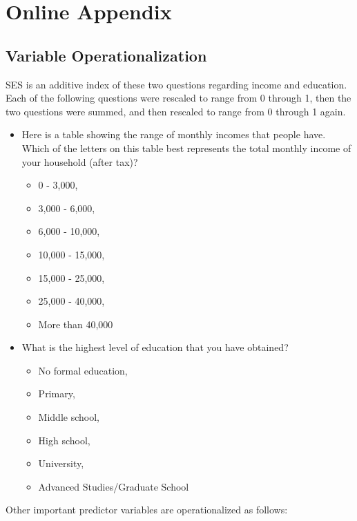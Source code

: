 \documentclass[]{interact}
\theoremstyle{plain}%
\theoremstyle{definition}
\theoremstyle{remark}
\begin{document}
\newpage{}

\section{Online Appendix}\label{online-appendix}

\subsection{Variable
Operationalization}\label{variable-operationalization}

SES is an additive index of these two questions regarding income and
education. Each of the following questions were rescaled to range from 0
through 1, then the two questions were summed, and then rescaled to
range from 0 through 1 again.

\begin{itemize}
\item
  Here is a table showing the range of monthly incomes that people have.
  Which of the letters on this table best represents the total monthly
  income of your household (after tax)?

  \begin{itemize}
  \item
    0 - 3,000,
  \item
    3,000 - 6,000,
  \item
    6,000 - 10,000,
  \item
    10,000 - 15,000,
  \item
    15,000 - 25,000,
  \item
    25,000 - 40,000,
  \item
    More than 40,000
  \end{itemize}
\item
  What is the highest level of education that you have obtained?

  \begin{itemize}
  \item
    No formal education,
  \item
    Primary,
  \item
    Middle school,
  \item
    High school,
  \item
    University,
  \item
    Advanced Studies/Graduate School
  \end{itemize}
\end{itemize}

Other important predictor variables are operationalized as follows:
\end{document}
